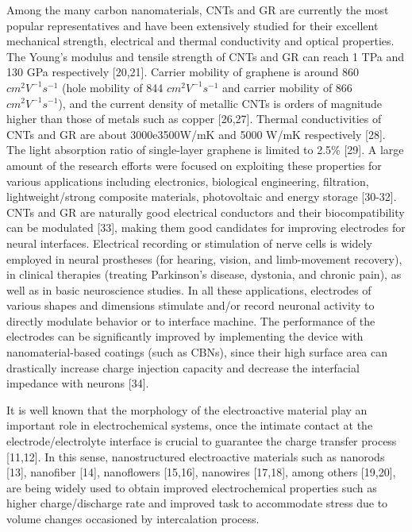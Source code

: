 Among the many carbon nanomaterials, CNTs and GR are currently the most popular representatives and have been extensively studied for their excellent mechanical strength, electrical and thermal conductivity and optical properties. The Young's modulus and tensile strength of CNTs and GR can reach 1 TPa and 130 GPa respectively [20,21]. Carrier mobility of graphene is around 860 $cm^{2} V^{-1} s^{-1}$ (hole mobility of 844 $cm^{2} V^{-1} s^{-1}$ and carrier mobility of 866 $cm^{2} V^{-1} s^{-1}$), and the current density of metallic CNTs is orders of magnitude higher than those of metals such as copper [26,27]. Thermal conductivities of CNTs and GR are about 3000e3500W/mK and 5000 W/mK respectively [28]. The light absorption ratio of single-layer graphene is limited to 2.5\% [29]. A large amount of the research efforts were focused on exploiting these properties for various applications including electronics, biological engineering, filtration, lightweight/strong composite materials, photovoltaic and energy storage [30-32]. CNTs and GR are naturally good electrical conductors and their biocompatibility can be modulated [33], making them good candidates for improving electrodes for neural interfaces. Electrical recording or stimulation of nerve cells is widely employed in neural prostheses (for hearing, vision, and limb-movement recovery), in clinical therapies (treating Parkinson's disease, dystonia, and chronic pain), as well as in basic neuroscience studies. In all these applications, electrodes of various shapes and dimensions stimulate and/or record neuronal activity to directly modulate behavior or to interface machine. The performance of the electrodes can be significantly improved by implementing the device with nanomaterial-based coatings (such as CBNs), since their high surface area can drastically increase charge injection capacity and decrease the interfacial impedance with neurons [34].

It is well known that the morphology of the electroactive material play an important role in electrochemical systems, once the intimate contact at the electrode/electrolyte interface is crucial to guarantee the charge transfer process [11,12]. In this sense, nanostructured electroactive materials such as nanorods [13], nanofiber [14], nanoflowers [15,16], nanowires [17,18], among others [19,20], are being widely used to obtain improved electrochemical properties such as higher charge/discharge rate and improved task to accommodate stress due to volume changes occasioned by intercalation process.

